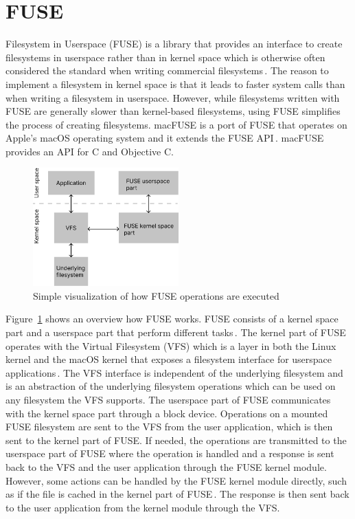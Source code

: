 \section{FUSE}
Filesystem in Userspace (FUSE) is a library that provides an interface to create filesystems in userspace rather than in kernel space which is otherwise often considered the standard when writing commercial filesystems\,\cite{Libfuse2021}. The reason to implement a filesystem in kernel space is that it leads to faster system calls than when writing a filesystem in userspace. However, while filesystems written with FUSE are generally slower than kernel-based filesystems, using FUSE simplifies the process of creating filesystems. macFUSE is a port of FUSE that operates on Apple's macOS operating system and it extends the FUSE API\,\cite{HomeMacFUSE}. macFUSE provides an API for C and Objective C.

\begin{figure}[!ht]
	\begin{center}
	  \includegraphics[width=0.5\textwidth]{figures/fuse_description.png}
	\end{center}
	\caption{Simple visualization of how FUSE operations are executed}
	\label{fig:fuse_desc}
\end{figure}

Figure~\ref{fig:fuse_desc} shows an overview how FUSE works. FUSE consists of a kernel space part and a userspace part that perform different tasks\,\cite{vangoorFUSENotFUSE2017}. The kernel part of FUSE operates with the Virtual Filesystem (\gls{VFS}) which is a layer in both the Linux kernel and the macOS kernel that exposes a filesystem interface for userspace applications\,\cite{goochOverviewLinuxVirtual, singhMacOSInternals2006}. The VFS interface is independent of the underlying filesystem and is an abstraction of the underlying filesystem operations which can be used on any filesystem the VFS supports. The userspace part of FUSE communicates with the kernel space part through a block device. Operations on a mounted FUSE filesystem are sent to the VFS from the user application, which is then sent to the kernel part of FUSE. If needed, the operations are transmitted to the userspace part of FUSE where the operation is handled and a response is sent back to the VFS and the user application through the FUSE kernel module. However, some actions can be handled by the FUSE kernel module directly, such as if the file is cached in the kernel part of FUSE\,\cite{vangoorFUSENotFUSE2017}. The response is then sent back to the user application from the kernel module through the VFS.